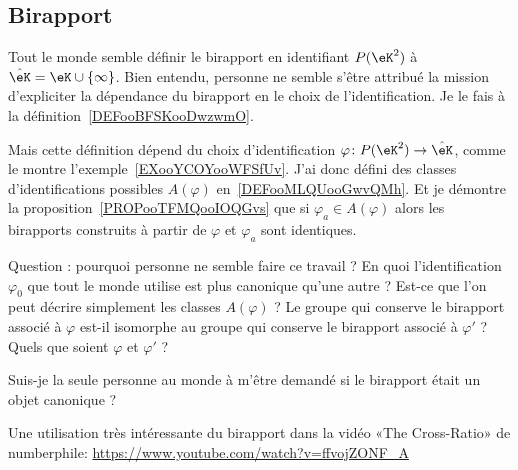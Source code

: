 \subsection{Birapport}

\begin{normaltext}
	Tout le monde semble définir le birapport en identifiant \( P(\eK^2)\) à \( \hat\eK=\eK\cup\{ \infty \}\). Bien entendu, personne ne semble s'être attribué la mission d'expliciter la dépendance du birapport en le choix de l'identification. Je le fais à la définition~\ref{DEFooBFSKooDwzwmO}.

	Mais cette définition dépend du choix d'identification \( \varphi\colon P(\eK^2)\to \hat\eK\), comme le montre l'exemple~\ref{EXooYCOYooWFSfUv}. J'ai donc défini des classes d'identifications possibles \( A(\varphi)\) en~\ref{DEFooMLQUooGwvQMh}. Et je démontre la proposition~\ref{PROPooTFMQooIOQGvs} que si \( \varphi_a\in A(\varphi)\) alors les birapports construits à partir de \( \varphi\) et \( \varphi_a\) sont identiques.

	Question : pourquoi personne ne semble faire ce travail ? En quoi l'identification \( \varphi_0\) que tout le monde utilise est plus canonique qu'une autre ? Est-ce que l'on peut décrire simplement les classes \( A(\varphi)\) ? Le groupe qui conserve le birapport associé à \( \varphi\) est-il isomorphe au groupe qui conserve le birapport associé à \( \varphi'\) ? Quels que soient \( \varphi\) et \( \varphi'\) ?

	Suis-je la seule personne au monde à m'être demandé si le birapport était un objet canonique ?
\end{normaltext}

\begin{normaltext}
	Une utilisation très intéressante du birapport dans la vidéo «The Cross-Ratio» de numberphile: \url{https://www.youtube.com/watch?v=ffvojZONF_A}
\end{normaltext}

